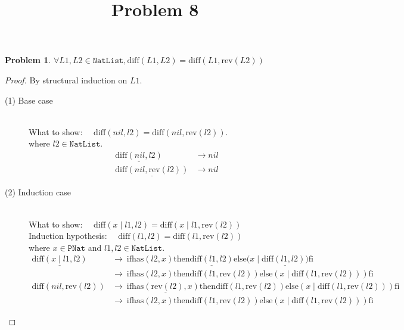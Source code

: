 \documentclass[12pt, a4paper]{article}
\title{Problem 8}
\date{\vspace{-5ex}}
\newtheorem{problem}{Problem}
\newcommand{\rel}[1]{\mathrel{#1}}
\newcommand{\rmx}[1]{\mathrm{#1}}
\newcommand{\larrow}{\longrightarrow}
\newcommand{\under}{\underline}
\begin{document}
\maketitle

\begin{problem}
$\forall L1, L2 \in \mathtt{NatList}, \rmx{diff}(L1, L2) = \rmx{diff}(L1, \rmx{rev}(L2))$
\end{problem}
\begin{proof}
By structural induction on $L1$.

\begin{description}
\item[(1) Base case]~\\
\noindent
What to show: $\quad \rmx{diff}(nil, l2) = \rmx{diff}(nil, \rmx{rev}(l2))$. \\
where $l2 \in \mathtt{NatList}$.
\begin{align*}
\under{\rmx{diff}(nil, l2)}
	&\larrow nil \tag{by diff1} \\
\under{\rmx{diff}(nil, \rmx{rev}(l2))}
	&\larrow nil \tag{by diff1}
\end{align*}
\item[(2) Induction case]~\\
What to show: $\quad \rmx{diff}(x \rel{|} l1, l2) = \rmx{diff}(x \rel{|} l1, \rmx{rev}(l2))$ \\
Induction hypothesis: $\quad \rmx{diff}(l1, l2) = \rmx{diff}(l1, \rmx{rev}(l2))$  \\
where $x \in \mathtt{PNat}$ and $l1, l2 \in \mathtt{NatList}$.
\begin{align*}
\under{\rmx{diff}(x \rel{|} l1, l2)}
	&\larrow\ \rel{\rmx{if}} \rmx{has}(l2, x) \rel{\rmx{then}} \under{\rmx{diff}(l1, l2)} \rel{\rmx{else}} (x \rel{|} \under{\rmx{diff}(l1, l2))} \rel{\rmx{fi}} \tag{by diff2} \\
	&\larrow\ \rel{\rmx{if}} \rmx{has}(l2, x) \rel{\rmx{then}} \rmx{diff}(l1, \rmx{rev}(l2)) \rel{\rmx{else}} (x \rel{|} \rmx{diff}(l1, \rmx{rev}(l2))) \rel{\rmx{fi}} \tag{by IH} \\
\rmx{diff}(nil, \rmx{rev}(l2))
	&\larrow\ \rel{\rmx{if}} \under{\rmx{has}(\rmx{rev}(l2), x)} \rel{\rmx{then}} \rmx{diff}(l1, \rmx{rev}(l2)) \rel{\rmx{else}} (x \rel{|} \rmx{diff}(l1, \rmx{rev}(l2))) \rel{\rmx{fi}} \tag{by diff2} \\
	&\larrow\ \rel{\rmx{if}} \rmx{has}(l2, x) \rel{\rmx{then}} \rmx{diff}(l1, \rmx{rev}(l2)) \rel{\rmx{else}} (x \rel{|} \rmx{diff}(l1, \rmx{rev}(l2))) \rel{\rmx{fi}} \tag{by Problem 6}
\end{align*}

\end{description}

\end{proof}
\end{document}
